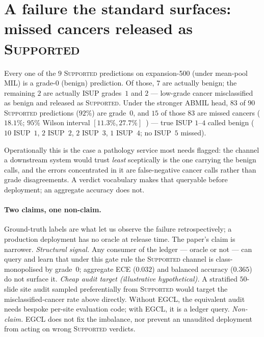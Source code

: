 \documentclass{article}
\newcommand{\SafeNum}[1]{#1}
\newcommand{\AggNum}[2]{#2}
\begin{document}
\section{A failure the standard surfaces: missed cancers released as \textsc{Supported}}
\label{sec:safety}

Every one of the $\AggNum{meanpool.supported.n}{9}$ \textsc{Supported} predictions on expansion-500 (under mean-pool MIL) is a grade-$\SafeNum{0}$ (benign) prediction. Of those, $\SafeNum{7}$ are actually benign; the remaining $\SafeNum{2}$ are actually ISUP grades~$\SafeNum{1}$ and $\SafeNum{2}$ --- low-grade cancer misclassified as benign and released as \textsc{Supported}. Under the stronger ABMIL head, $\AggNum{abmil.supported.grade0.n}{83}$ of $\AggNum{abmil.supported.n}{90}$ \textsc{Supported} predictions ($\SafeNum{92}\%$) are grade~$\SafeNum{0}$, and $\AggNum{abmil.supported.missed_cancer}{15}$ of those $\AggNum{abmil.supported.grade0.n}{83}$ are missed cancers ($\AggNum{abmil.supported.missed_cancer.pct}{18.1}\%$; $\SafeNum{95}\%$ Wilson interval $[\AggNum{abmil.supported.missed_cancer.wilson.lo.pct}{11.3}\%, \AggNum{abmil.supported.missed_cancer.wilson.hi.pct}{27.7}\%]$~\citep{wilson1927}) --- true ISUP $\SafeNum{1}$--$\SafeNum{4}$ called benign ($\SafeNum{10}$ ISUP~$\SafeNum{1}$, $\SafeNum{2}$ ISUP~$\SafeNum{2}$, $\SafeNum{2}$ ISUP~$\SafeNum{3}$, $\SafeNum{1}$ ISUP~$\SafeNum{4}$; no ISUP~$\SafeNum{5}$ missed).

Operationally this is the case a pathology service most needs flagged: the channel a downstream system would trust \emph{least} sceptically is the one carrying the benign calls, and the errors concentrated in it are false-negative cancer calls rather than grade disagreements. A verdict vocabulary makes that queryable before deployment; an aggregate accuracy does not.

\paragraph{Two claims, one non-claim.} Ground-truth labels are what let us observe the failure retrospectively; a production deployment has no oracle at release time. The paper's claim is narrower.
\emph{Structural signal.} Any consumer of the ledger --- oracle or not --- can query and learn that under this gate rule the \textsc{Supported} channel is class-monopolised by grade~$\SafeNum{0}$; aggregate ECE ($\SafeNum{0.032}$) and balanced accuracy ($\SafeNum{0.365}$) do not surface it.
\emph{Cheap audit target (illustrative hypothetical).} A stratified $\SafeNum{50}$-slide site audit sampled preferentially from \textsc{Supported} would target the misclassified-cancer rate above directly. Without EGCL, the equivalent audit needs bespoke per-site evaluation code; with EGCL, it is a ledger query.
\emph{Non-claim.} EGCL does not fix the imbalance, nor prevent an unaudited deployment from acting on wrong \textsc{Supported} verdicts.
\end{document}

